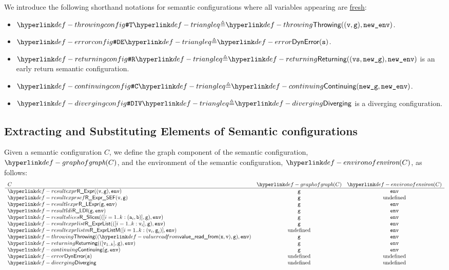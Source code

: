 We introduce the following shorthand notations for semantic configurations where all variables
appearing are \hyperlink{def-freshvariables}{fresh}:
\begin{itemize}
\hypertarget{def-throwingconfig}{}
\item $\ThrowingConfig \triangleq \Throwing((\vv, \vg), \newenv)$.
      \hypertarget{def-errorconfig}{}
\item $\DynErrorConfig \triangleq \DynamicError(\vs)$.
      \hypertarget{def-returningconfig}{}
\item $\ReturningConfig \triangleq \Returning((\vvs,\newg), \newenv)$
      is an early return semantic configuration.
\hypertarget{def-continuingconfig}{}
\item $\ContinuingConfig \triangleq \Continuing(\newg, \newenv)$.
      \hypertarget{def-divergingconfig}{}
\item $\DivergingConfig \triangleq \Diverging$ is a diverging configuration.
\end{itemize}

\subsection{Extracting and Substituting Elements of Semantic configurations}

\hypertarget{def-graphof}{}
\hypertarget{def-environof}{}
Given a semantic configuration $C$, we define the graph component of the semantic configuration, \\
$\graphof{C}$, and the environment of the semantic configuration, $\environof{C}$, as follows:
\[
\begin{array}{lcc}
  C & \graphof{C} & \environof{C}\\
  \hline
  \ResultExpr((\vv, \vg), \env) & \vg & \env\\
  \ResultExprSEF(\vv, \vg) & \vg & \text{undefined}\\
  \ResultLexpr(\vg, \env) & \vg & \env \\
  \ResultLDI(\vg, \env) & \vg & \env \\
  \ResultSlices(([i=1..k: (\va_i,\vb)], \vg), \env) & \vg & \env \\
  \ResultExprList(([i=1..k: \vv_i], \vg), \env) & \vg & \env \\
  \ResultExprListM([i=1..k: (\vv_i,\vg_i)], \env) & \text{undefined} & \env\\
  \Throwing((\valuereadfrom(\vx,\vv),\vg), \env) & \vg & \env\\
  \Returning(([\vv_{1..k}],\vg), \env) & \vg & \env\\
  \Continuing(\vg, \env) & \vg & \env\\
  \DynamicError(\vs) & \text{undefined} & \text{undefined}\\
  \Diverging & \text{undefined} & \text{undefined}\\
\end{array}
\]

